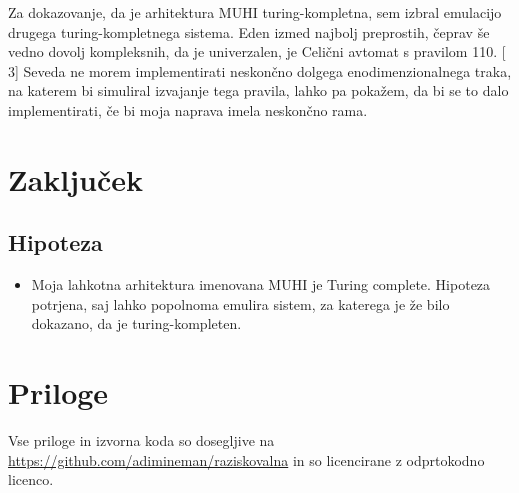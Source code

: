 \documentclass[12pt]{article}
\begin{document}
Za dokazovanje, da je arhitektura MUHI turing-kompletna, sem izbral emulacijo drugega turing-kompletnega sistema.
Eden izmed najbolj preprostih, čeprav še vedno dovolj kompleksnih, da je univerzalen, je Celični avtomat s pravilom 110. [$3$]
Seveda ne morem implementirati neskončno dolgega enodimenzionalnega traka, na katerem bi simuliral izvajanje tega pravila, lahko pa pokažem, da bi se to dalo implementirati, če bi moja naprava imela neskončno rama.

\section{Zaključek}
\subsection{Hipoteza}
\begin{itemize}
  \item Moja lahkotna arhitektura imenovana MUHI je Turing complete.
  Hipoteza potrjena, saj lahko popolnoma emulira sistem, za katerega je že bilo dokazano, da je turing-kompleten.
\end{itemize}

\section{Priloge}

Vse priloge in izvorna koda so dosegljive na \url{https://github.com/adimineman/raziskovalna} in so licencirane z odprtokodno licenco.

\lstset{
  basicstyle=\tiny,
  breaklines=true,
  frame=single,
  stepnumber=5,
}









%


\end{document}
